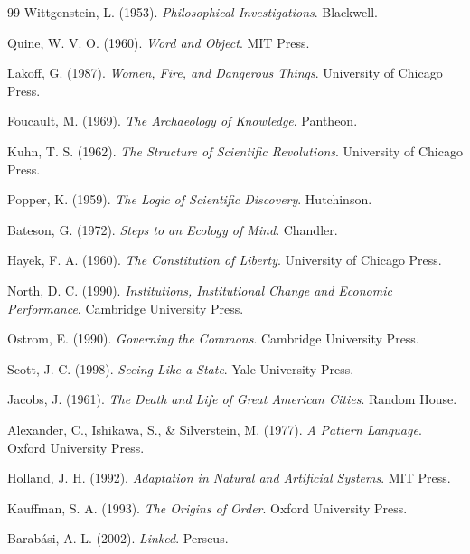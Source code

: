 \documentclass[11pt,oneside]{book}
\theoremstyle{plain}
\theoremstyle{definition}
\theoremstyle{remark}
\begin{document}
\begin{thebibliography}{99}
Wittgenstein, L. (1953).
\newblock
\emph{Philosophical Investigations}.
\newblock Blackwell.

Quine, W. V. O. (1960).
\newblock
\emph{Word and Object}.
\newblock MIT Press.

Lakoff, G. (1987).
\newblock
\emph{Women, Fire, and Dangerous Things}.
\newblock University of Chicago Press.

Foucault, M. (1969).
\newblock
\emph{The Archaeology of Knowledge}.
\newblock Pantheon.

Kuhn, T. S. (1962).
\newblock
\emph{The Structure of Scientific Revolutions}.
\newblock University of Chicago Press.

Popper, K. (1959).
\newblock
\emph{The Logic of Scientific Discovery}.
\newblock Hutchinson.

Bateson, G. (1972).
\newblock
\emph{Steps to an Ecology of Mind}.
\newblock Chandler.

Hayek, F. A. (1960).
\newblock
\emph{The Constitution of Liberty}.
\newblock University of Chicago Press.

North, D. C. (1990).
\newblock
\emph{Institutions, Institutional Change and Economic Performance}.
\newblock Cambridge University Press.

Ostrom, E. (1990).
\newblock
\emph{Governing the Commons}.
\newblock Cambridge University Press.

Scott, J. C. (1998).
\newblock
\emph{Seeing Like a State}.
\newblock Yale University Press.

Jacobs, J. (1961).
\newblock
\emph{The Death and Life of Great American Cities}.
\newblock Random House.

Alexander, C., Ishikawa, S.,
\& Silverstein, M. (1977).
\newblock
\emph{A Pattern Language}.
\newblock Oxford University Press.

Holland, J. H. (1992).
\newblock
\emph{Adaptation in Natural and Artificial Systems}.
\newblock MIT Press.

Kauffman, S. A. (1993).
\newblock
\emph{The Origins of Order}.
\newblock Oxford University Press.

Barab\'asi, A.-L. (2002).
\newblock
\emph{Linked}.
\newblock Perseus.


\end{thebibliography}
\end{document}
